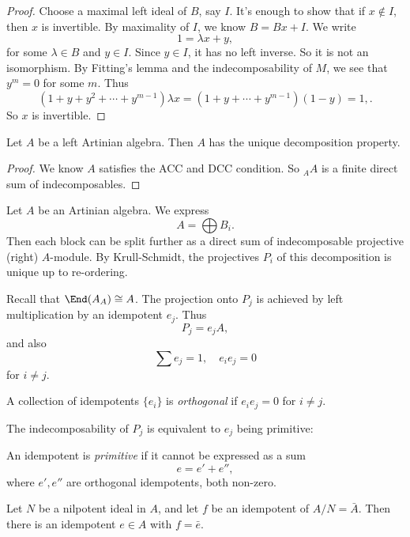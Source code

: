 \documentclass[a4paper]{article}
\begin{document}
\begin{proof}
  Choose a maximal left ideal of $B$, say $I$. It's enough to show that if $x \not \in I$, then $x$ is invertible. By maximality of $I$, we know $B = Bx + I$. We write
  \[
    1 = \lambda x + y,
  \]
  for some $\lambda \in B$ and $y \in I$. Since $y \in I$, it has no left inverse. So it is not an isomorphism. By Fitting's lemma and the indecomposability of $M$, we see that $y^m = 0$ for some $m$. Thus
  \[
    (1 + y + y^2 + \cdots + y^{m - 1}) \lambda x = (1 + y + \cdots + y^{m - 1})(1 - y) = 1,.
  \]
  So $x$ is invertible.
\end{proof}

\begin{cor}
  Let $A$ be a left Artinian algebra. Then $A$ has the unique decomposition property.
\end{cor}

\begin{proof}
  We know $A$ satisfies the ACC and DCC condition. So $_A A$ is a finite direct sum of indecomposables.
\end{proof}

Let $A$ be an Artinian algebra. We express
\[
  A = \bigoplus B_i.
\]
Then each block can be split further as a direct sum of indecomposable projective (right) $A$-module. By Krull-Schmidt, the projectives $P_i$ of this decomposition is unique up to re-ordering.

Recall that $\End(A_A) \cong A$. The projection onto $P_j$ is achieved by left multiplication by an idempotent $e_j$. Thus
\[
  P_j = e_j A,
\]
and also
\[
  \sum e_j = 1,\quad e_i e_j = 0
\]
for $i \not= j$.
\begin{defi}
  A collection of idempotents $\{e_i\}$ is \emph{orthogonal} if $e_i e_j = 0$ for $i \not= j$.
\end{defi}

The indecomposability of $P_j$ is equivalent to $e_j$ being primitive:
\begin{defi}
  An idempotent is \emph{primitive} if it cannot be expressed as a sum
  \[
    e = e' + e'',
  \]
  where $e', e''$ are orthogonal idempotents, both non-zero.
\end{defi}

\begin{prop}
  Let $N$ be a nilpotent ideal in $A$, and let $f$ be an idempotent of $A/N = \bar{A}$. Then there is an idempotent $e \in A$ with $f = \bar{e}$.
\end{prop}
\end{document}
